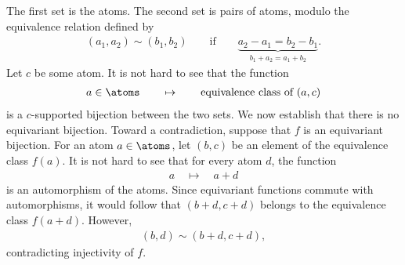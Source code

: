{The first set is the atoms. The second set is pairs of atoms, modulo the equivalence relation defined by 
\begin{align*}
 (a_1,a_2) \sim (b_1,b_2) \qquad \text{if} \qquad \underbrace{a_2 - a_1 = b_2 - b_1}_{b_1+a_2 = a_1 + b_2}.
\end{align*}
Let $c$ be some atom. It is not hard to see that the function
\begin{align*}
 a \in \atoms \qquad \mapsto \qquad \text{equivalence class of $(a,c)$}
\end{align*}
is a $c$-supported bijection between the two sets. We now establish that there is no equivariant bijection. Toward a contradiction, suppose that $f$ is an equivariant bijection. For an atom $a \in \atoms$, let $(b,c)$ be an element of the equivalence class $f(a)$. It is not hard to see that for every atom $d$, the function
\begin{align*}
 a \quad \mapsto \quad a+d
\end{align*}
is an automorphism of the atoms. Since equivariant functions commute with automorphisms, it would follow that 
$(b+d,c+d)$ belongs to the equivalence class $f(a+d)$. However,
 \begin{align*}
 (b,d) \sim (b+d,c+d),
 \end{align*}
 contradicting injectivity of $f$. 
}